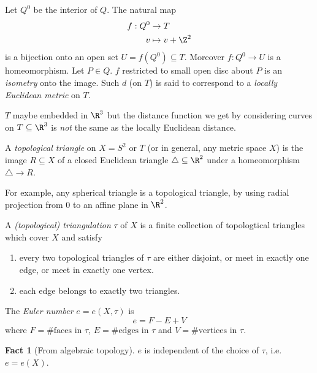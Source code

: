 \documentclass[a4paper]{article}
\theoremstyle{definition}
\newtheorem*{fact}{Fact}
\begin{document}
Let \(Q^0\) be the interior of \(Q\). The natural map
\begin{align*}
  f: Q^0 &\to T \\
  v &\mapsto v + \Z^2
\end{align*}
is a bijection onto an open set \(U = f(Q^0) \subseteq T\). Moreover \(f: Q^0 \to U\) is a homeomorphism. Let \(P \in Q\). \(f\) restricted to small open disc about \(P\) is an \emph{isometry} onto the image. Such \(d\) (on \(T\)) is said to correspond to a \emph{locally Euclidean metric} on \(T\).

\(T\) maybe embedded in \(\R^3\) but the distance function we get by considering curves on \(T \subseteq \R^3\) is \emph{not} the same as the locally Euclidean distance.

\begin{definition}
  A \emph{topological triangle} on \(X = S^2\) or \(T\) (or in general, any metric space \(X\)) is the image \(R \subseteq X\) of a closed Euclidean triangle \(\triangle \subseteq \R^2\) under a homeomorphism \(\triangle \to R\).
\end{definition}

For example, any spherical triangle is a topological triangle, by using radial projection from \(0\) to an affine plane in \(\R^2\).

\begin{definition}
  A \emph{(topological) triangulation} \(\tau\) of \(X\) is a finite collection of topologtical triangles which cover \(X\) and satisfy
  \begin{enumerate}
  \item every two topological triangles of \(\tau\) are either disjoint, or meet in exactly one edge, or meet in exactly one vertex.
  \item each edge belongs to exactly two triangles.
  \end{enumerate}
\end{definition}

\begin{definition}
  The \emph{Euler number} \(e = e(X, \tau)\) is
  \[
    e = F - E + V
  \]
  where \(F = \# \text{faces in } \tau\), \(E = \#\text{edges in } \tau\) and \(V = \# \text{vertices in } \tau\).
\end{definition}

\begin{fact}[From algebraic topology]
  \(e\) is independent of the choice of \(\tau\), i.e.\ \(e = e(X)\).
\end{fact}
\end{document}
